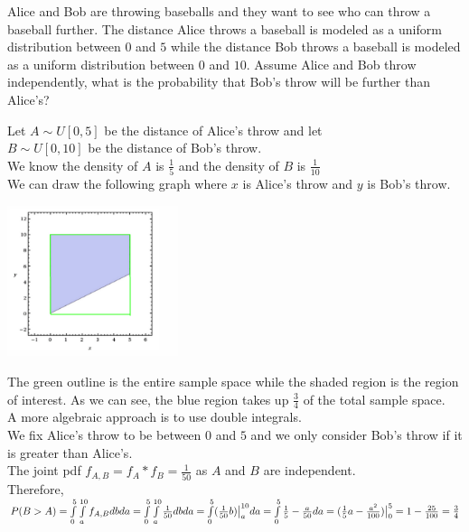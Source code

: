 \question Alice and Bob are throwing baseballs and they want to see who can throw a baseball further. The distance Alice throws a baseball is modeled as a uniform distribution between $0$ and $5$ while the distance Bob throws a baseball is modeled as a uniform distribution between $0$ and $10$. Assume Alice and Bob throw independently, what is the probability that Bob's throw will be further than Alice's?
\begin{solution}
	Let $A \mathtt{\sim} U[0, 5]$ be the distance of Alice's throw and let \\
	$B \mathtt{\sim} U[0, 10]$ be the distance of Bob's throw.  \\
	We know the density of $A$ is $\frac{1}{5}$ and the density of $B$ is $\frac{1}{10}$ \\
	We can draw the following graph where $x$ is Alice's throw and $y$ is Bob's throw. \\
	
	\begin{center}
		\includegraphics[width=5cm]{joint_uniform.png}
	\end{center}
	The green outline is the entire sample space while the shaded region is the region of interest. As we can see, the blue region takes up $\frac{3}{4}$ of the total sample space. \\
	
	A more algebraic approach is to use double integrals. \\
	We fix Alice's throw to be between $0$ and $5$ and we only consider Bob's throw if it is greater than Alice's. \\
	The joint pdf $f_{A, B} = f_A * f_B = \frac{1}{50}$ as $A$ and $B$ are independent.  \\
	Therefore, \\
	$P(B > A)   \\
	= \int\limits_{0}^{5}\int\limits_{a}^{10}f_{A, B} db da \\
	=  \int\limits_{0}^{5}\int\limits_{a}^{10}\frac{1}{50} db da \\
	= \int\limits_{0}^{5} (\frac{1}{50}b)\big|_{a}^{10} da \\
	=  \int\limits_{0}^{5} \frac{1}{5} - \frac{a}{50} da \\
	= (\frac{1}{5}a - \frac{a^2}{100})\big|_{0}^{5} = 1 - \frac{25}{100} = \frac{3}{4}$
	
\end{solution}